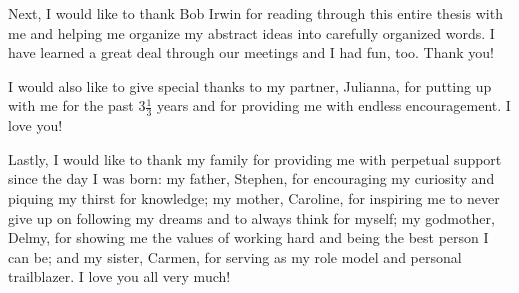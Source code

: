 Next, I would like to thank Bob Irwin for reading through this entire thesis with me and helping me organize my abstract ideas into carefully organized words. I have learned a great deal through our meetings and I had fun, too. Thank you! 

I would also like to give special thanks to my partner, Julianna, for  putting up with me for the past $3\frac{1}{3}$ years and for providing me with endless encouragement. I love you!

Lastly, I would like to thank my family for providing me with perpetual support since the day I was born: my father, Stephen, for encouraging my curiosity and piquing my thirst for knowledge; my mother, Caroline, for inspiring me to never give up on following my dreams and to always think for myself; my godmother, Delmy, for showing me the values of working hard and being the best person I can be; and my sister, Carmen, for serving as my role model and personal trailblazer. I love you all very much!

 
